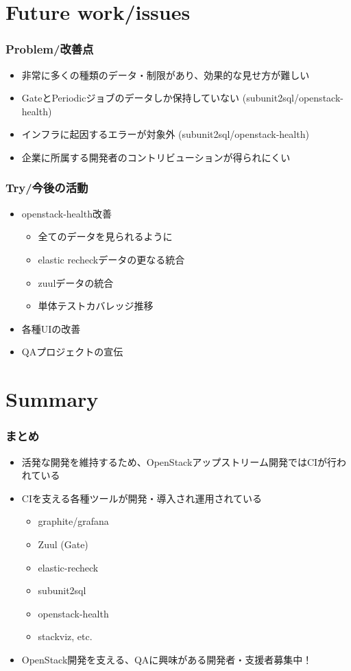 \documentclass[aspectratio=169,11pt,hyperref={colorlinks=true}]{beamer}
\begin{document}
\section{Future work/issues}
\begin{frame}
  \frametitle{Problem/改善点}
  \begin{itemize}
    \item 非常に多くの種類のデータ・制限があり、効果的な見せ方が難しい
    \item GateとPeriodicジョブのデータしか保持していない (subunit2sql/openstack-health)
    \item インフラに起因するエラーが対象外 (subunit2sql/openstack-health)
    \item 企業に所属する開発者のコントリビューションが得られにくい
  \end{itemize}
\end{frame}

\begin{frame}
  \frametitle{Try/今後の活動}
  \begin{itemize}
    \item openstack-health改善
    \begin{itemize}
      \item 全てのデータを見られるように
      \item elastic recheckデータの更なる統合
      \item zuulデータの統合
      \item 単体テストカバレッジ推移
    \end{itemize}
    \item 各種UIの改善
    \item QAプロジェクトの宣伝
  \end{itemize}
\end{frame}

\section{Summary}
\begin{frame}
  \frametitle{まとめ}
  \begin{itemize}
    \item 活発な開発を維持するため、OpenStackアップストリーム開発ではCIが行われている
    \item CIを支える各種ツールが開発・導入され運用されている
    \begin{itemize}
      \item graphite/grafana
      \item Zuul (Gate)
      \item elastic-recheck
      \item subunit2sql
      \item openstack-health
      \item stackviz, etc.
    \end{itemize}
    \item OpenStack開発を支える、QAに興味がある開発者・支援者募集中！
  \end{itemize}
\end{frame}
\end{document}
